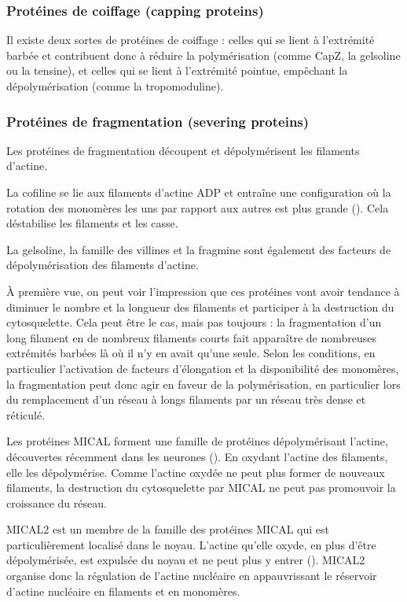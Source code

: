 \subsubsection{Protéines de coiffage (capping proteins)}

Il existe deux sortes de protéines de coiffage : celles qui se lient à l'extrémité barbée et contribuent donc à réduire la polymérisation (comme CapZ, la gelsoline ou la tensine), et celles qui se lient à l'extrémité pointue, empêchant la dépolymérisation (comme la tropomoduline). 


\subsubsection{Protéines de fragmentation (severing proteins)}
Les protéines de fragmentation découpent et dépolymérisent les filaments d'actine. 

La cofiline se lie aux filaments d'actine ADP et entraîne une configuration où la rotation des monomères les uns par rapport aux autres est plus grande (\cite{mcgough_cofilin_1997}). Cela déstabilise les filaments et les casse. 

La gelsoline, la famille des villines et la fragmine sont également des facteurs de dépolymérisation des filaments d'actine. 

À première vue, on peut voir l'impression que ces protéines vont avoir tendance à diminuer le nombre et la longueur des filaments et participer à la destruction du cytosquelette. Cela peut être le cas, mais pas toujours : la fragmentation d'un long filament en de nombreux filaments courts fait apparaître de nombreuses extrémités barbées là où il n'y en avait qu'une seule. Selon les conditions, en particulier l'activation de facteurs d'élongation et la disponibilité des monomères, la fragmentation peut donc agir en faveur de la polymérisation, en particulier lors du remplacement d'un réseau à longs filaments par un réseau très dense et réticulé. 

Les protéines MICAL forment une famille de protéines dépolymérisant l'actine, découvertes récemment dans les neurones (\cite{hung_direct_2011}). En oxydant l'actine des filaments, elle les dépolymérise. Comme l'actine oxydée ne peut plus former de nouveaux filaments, la destruction du cytosquelette par MICAL ne peut pas promouvoir la croissance du réseau. 

MICAL2 est un membre de la famille des protéines MICAL qui est particulièrement localisé dans le noyau. L'actine qu'elle oxyde, en plus d'être dépolymérisée, est expulsée du noyau et ne peut plus y entrer (\cite{lundquist_redox_2014}). MICAL2 organise donc la régulation de l'actine nucléaire en appauvrissant le réservoir d'actine nucléaire en filaments et en monomères.

